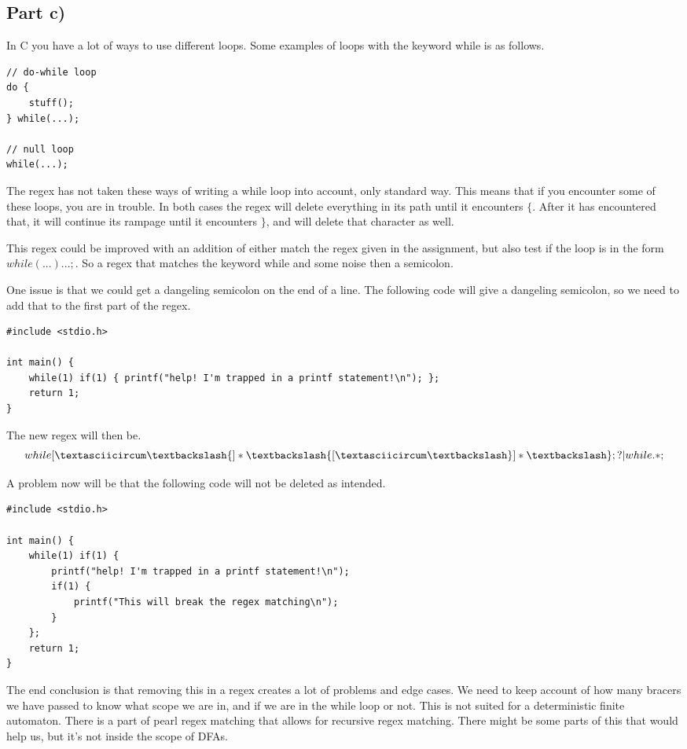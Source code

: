 \documentclass[paper=a4, fontsize=11pt]{scrartcl} %
\numberwithin{equation}{section} %
\numberwithin{figure}{section} %
\numberwithin{table}{section} %
\begin{document}
\subsection{Part c)}
In C you have a lot of ways to use different loops. Some examples of loops with the keyword while is as follows.
\begin{lstlisting}
// do-while loop
do {
    stuff();
} while(...);

// null loop
while(...);
\end{lstlisting}

The regex has not taken these ways of writing a while loop into account, only standard way. This means that if you encounter some of these loops, you are in trouble. In both cases the regex will delete everything in its path until it encounters $\{$. After it has encountered that, it will continue its rampage until it encounters $\}$, and will delete that character as well.

This regex could be improved with an addition of either match the regex given in the assignment, but also test if the loop is in the form $while(...) ... ;$. So a regex that matches the keyword while and some noise then a semicolon.

One issue is that we could get a dangeling semicolon on the end of a line. The following code will give a dangeling semicolon, so we need to add that to the first part of the regex.

\begin{lstlisting}
#include <stdio.h>

int main() {
    while(1) if(1) { printf("help! I'm trapped in a printf statement!\n"); };
    return 1;
}
\end{lstlisting}

The new regex will then be.
$$while[\textasciicircum\textbackslash\{]*\textbackslash\{[\textasciicircum\textbackslash\}]*\textbackslash\};?|while.*;$$

A problem now will be that the following code will not be deleted as intended.
\begin{lstlisting}
#include <stdio.h>

int main() {
    while(1) if(1) {
        printf("help! I'm trapped in a printf statement!\n");
        if(1) {
            printf("This will break the regex matching\n");
        }
    };
    return 1;
}
\end{lstlisting}

The end conclusion is that removing this in a regex creates a lot of problems and edge cases. We need to keep account of how many bracers we have passed to know what scope we are in, and if we are in the while loop or not. This is not suited for a deterministic finite automaton. There is a part of pearl regex matching that allows for recursive regex matching. There might be some parts of this that would help us, but it's not inside the scope of DFAs.
\end{document}
